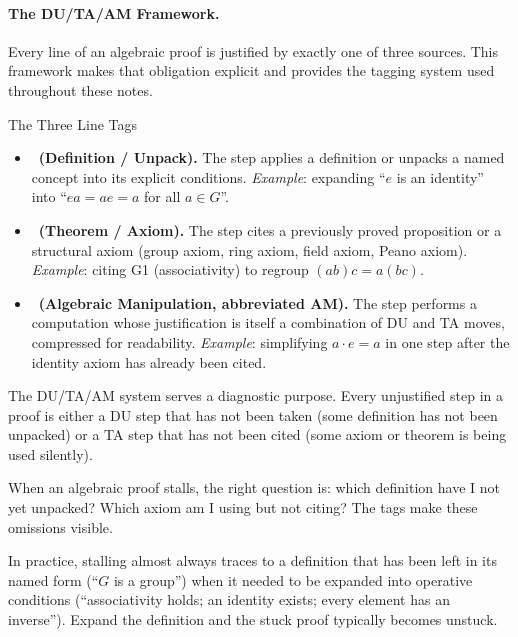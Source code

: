 \paragraph{The DU/TA/AM Framework.}

Every line of an algebraic proof is justified by exactly one of three
sources. This framework makes that obligation explicit and provides
the tagging system used throughout these notes.

\begin{propositionbox}{The Three Line Tags}
\begin{itemize}[itemsep=4pt]
  \item \tagDU\ \textbf{(Definition / Unpack).}
    The step applies a definition or unpacks a named concept into its
    explicit conditions.
    \textit{Example}: expanding ``$e$ is an identity'' into
    ``$ea = ae = a$ for all $a \in G$''.

  \item \tagTA\ \textbf{(Theorem / Axiom).}
    The step cites a previously proved proposition or a structural
    axiom (group axiom, ring axiom, field axiom, Peano axiom).
    \textit{Example}: citing G1 (associativity) to regroup $(ab)c = a(bc)$.

  \item \tagTA\ \textbf{(Algebraic Manipulation, abbreviated AM).}
    The step performs a computation whose justification is itself a
    combination of DU and TA moves, compressed for readability.
    \textit{Example}: simplifying $a \cdot e = a$ in one step after
    the identity axiom has already been cited.
\end{itemize}
\end{propositionbox}

\begin{remark}
The DU/TA/AM system serves a diagnostic purpose. Every unjustified step
in a proof is either a DU step that has not been taken (some definition
has not been unpacked) or a TA step that has not been cited (some axiom
or theorem is being used silently).

When an algebraic proof stalls, the right question is: which definition
have I not yet unpacked? Which axiom am I using but not citing? The
tags make these omissions visible.

In practice, stalling almost always traces to a definition that has
been left in its named form (``$G$ is a group'') when it needed to be
expanded into operative conditions (``associativity holds; an identity
exists; every element has an inverse''). Expand the definition and
the stuck proof typically becomes unstuck.
\end{remark}

